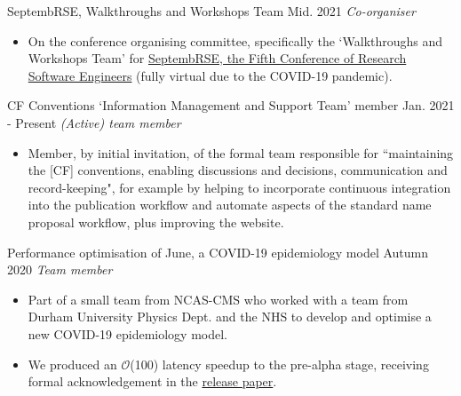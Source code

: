 \begin{projects}
\projecta
	{SeptembRSE, Walkthroughs and Workshops Team \lbrack\href{https://septembrse.society-rse.org/committee/}{\small{\websiteSymbol}}\rbrack}{Mid. 2021}
	{
	    \textit{Co-organiser}
	}
	{\begin{itemize}
     \item On the conference organising committee, specifically the `Walkthroughs and Workshops Team' for \href{https://septembrse.society-rse.org/}{SeptembRSE, the Fifth Conference of Research Software Engineers} (fully virtual due to the COVID-19 pandemic).
     \end{itemize}}

\end{projects}
\begin{projects}

\projecta
	{CF Conventions `Information Management and Support Team' member \lbrack\href{https://cfconventions.org/governance.html}{\small{\websiteSymbol}}\rbrack}{Jan. 2021 - Present}
	{
	    \textit{(Active) team member}
	}
	{\begin{itemize}
     \item Member, by initial invitation, of the formal team responsible for ``maintaining the [CF] conventions, enabling discussions and decisions, communication and record-keeping", for example by helping to incorporate continuous integration into the publication workflow and automate aspects of the standard name proposal workflow, plus improving the website.
     \end{itemize}}

\projecta
	{Performance optimisation of June, a COVID-19 epidemiology model
    \lbrack\href{https://github.com/IDAS-Durham/JUNE}{\small{\githubSymbol}}\rbrack}{Autumn 2020}
	{
	    \textit{Team member}
	}
	{\begin{itemize}
     \item Part of a small team from NCAS-CMS who worked with a team from Durham University Physics Dept. and the NHS to develop and optimise a new COVID-19 epidemiology model.
     \item We produced an $\mathcal{O}$(100) latency speedup to the pre-alpha stage, receiving formal acknowledgement in the \href{https://royalsocietypublishing.org/doi/10.1098/rsos.210506}{release paper}.
     \end{itemize}}


\end{projects}
